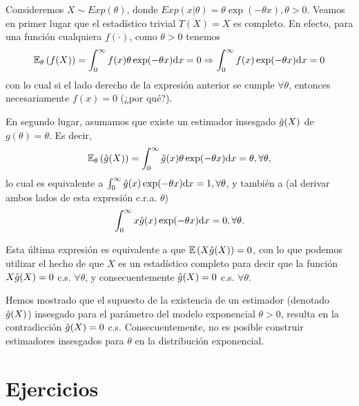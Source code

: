 \begin{example}
	\label{ex:estimador_exponancial}
	Consideremos $X\sim Exp(\theta)$, donde $Exp(x|\theta) = \theta\exp(-\theta x),\theta>0$. Veamos en primer lugar que el estadístico trivial $T(X) = X$ es completo. En efecto, para una función cualquiera $f(\cdot)$, como $\theta>0$ tenemos
	\begin{equation}
	    \mathbb{E}_\theta \left(f(X)\right) = \int_0^\infty f(x)\theta\exp(-\theta x){\text{d}} x = 0 \Rightarrow  \int_0^\infty f(x)\exp(-\theta x){\text{d}} x = 0
	\end{equation}
	con lo cual si el lado derecho de la expresión anterior se cumple  $\forall \theta$, entonces necesariamente $f(x)=0$ (¿por qué?).
	
	En segundo lugar, asumamos que existe un estimador insesgado ${ \hat{g}(X)}$ de $g(\theta) = \theta$. Es decir, 
	\begin{equation}
	\nonumber
		\mathbb{E}_\theta \left({ \hat{g}(X)}\right) = \int_0^\infty { \hat{g}(x)}\theta\exp(-\theta x){\text{d}} x = \theta, \forall \theta,
	\end{equation}
	lo cual es equivalente a $\int_0^\infty { \hat{g}(x)}\exp(-\theta x){\text{d}} x = 1, \forall \theta$, y también a (al derivar ambos lados de esta expresión c.r.a. $\theta$) 
	\begin{equation}
	    \int_0^\infty x{ \hat{g}(x)}\exp(-\theta x){\text{d}} x = 0, \forall \theta.
	\end{equation}

	Esta última expresión es equivalente a que $\mathbb{E} \left(X{ \hat{g}(X)}\right) = 0$, con lo que podemos utilizar el hecho de que $X$ es un estadístico completo para decir que la función $X{ \hat{g}(X)}=0$ c.s. $\forall \theta$, y consecuentemente ${ \hat{g}(X)}=0$ c.s. $\forall \theta$. 
	
	Hemos mostrado que el supuesto de la existencia de un estimador (denotado ${ \hat{g}(X)}$) insesgado para el parámetro del modelo exponencial $\theta>0$, resulta en la contradicción ${ \hat{g}(X)}=0$ c.s. Consecuentemente, no es posible construir estimadores insesgados para $\theta$ en la distribución exponencial.
\end{example}

\section{Ejercicios}

